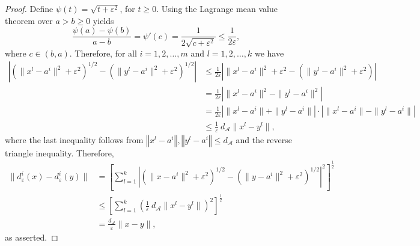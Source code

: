 \documentclass[12pt]{article}
\numberwithin{equation}{section}
\newcommand{\norm}[1]{\left\Vert {#1} \right\Vert} %
\def\abs#1{\left\lvert#1\right\rvert}
\begin{document}
\begin{proof}
Define $\psi(t)=\sqrt{t + {\varepsilon}^2}$, for $t \geq 0$. Using the Lagrange mean value theorem over $a > b \geq 0$ yields
\begin{equation*}
	\frac{\psi(a) - \psi(b)}{a - b} = \psi'(c) = \frac{1}{2\sqrt{c + {\varepsilon}^2}} \leq \frac{1}{2\varepsilon},
\end{equation*}
where $c \in (b,a)$.
Therefore, for all $i=1,2, \ldots, m$ and $l=1,2, \ldots, k$ we have
\begin{align*}
	\abs{\left( \|x^l-a^i\|^2  + {\varepsilon}^2 \right)^{1/2} - \left( \|y^l-a^i\|^2 + {\varepsilon}^2 \right)^{1/2} } 
	&\leq \frac{1}{2\varepsilon} \abs{ \|x^l-a^i\|^2 + {\varepsilon}^2 - \left( \|y^l-a^i\|^2 + {\varepsilon}^2 \right) } \\
	&= \frac{1}{2\varepsilon} \abs{\|x^l-a^i\|^2 - \|y^l-a^i\|^2} \\
	&= \frac{1}{2\varepsilon} \abs{\|x^l-a^i\| + \|y^l-a^i\|} \cdot \abs{\|x^l-a^i\| - \|y^l-a^i\|} \\
	&\leq \frac{1}{\varepsilon} \: d_{\mathcal{A}}\|x^l-y^l\| ,
\end{align*}
where the last inequality follows from $\norm{x^l-a^i},\norm{y^l-a^i} \leq d_{\mathcal{A}}$ and the reverse triangle inequality. Therefore,
\begin{align*}
	\|d_{\varepsilon}^i(x) - d_{\varepsilon}^i(y)\| 
	&= \left[ \sum_{l=1}^{k} \abs{\left( \|x-a^i\|^2  + {\varepsilon}^2 \right)^{1/2} - \left( \|y-a^i\|^2 + {\varepsilon}^2 \right)^{1/2} }^2 \right]^\frac{1}{2} \\
	&\leq \left[ \sum_{l=1}^{k} \left( \frac{1}{\varepsilon} \: d_{\mathcal{A}}\|x^l-y^l\| \right)^2 \right]^\frac{1}{2} \\
	&= \frac{ d_{\mathcal{A}}}{\varepsilon}\|x-y\| ,
\end{align*}
as asserted.
\end{proof}
\end{document}
